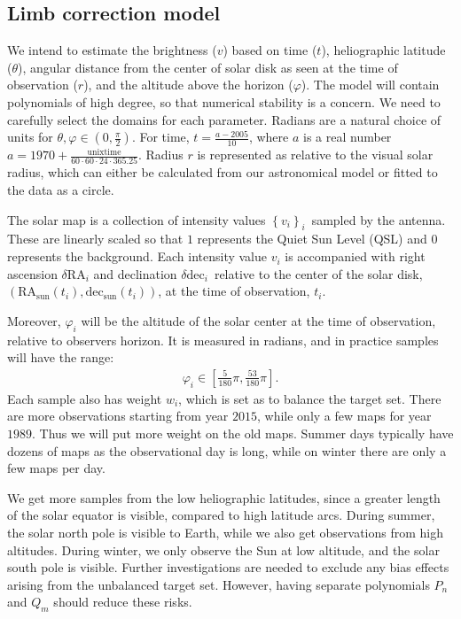 \documentclass{aa}
\newcommand{\eqnl}[2]{\begin{eqnarray}\label{#1}#2\end{eqnarray}}
\begin{document}
\subsection{Limb correction model}

We intend to estimate the brightness ($v$) based on time ($t$), heliographic latitude ($\theta$), angular distance from the 
center of solar disk as seen at the time of observation ($r$), and the altitude above the horizon ($\varphi$). The model 
will contain polynomials of high degree, so that numerical stability is a concern. We need to carefully select the 
domains for each parameter. Radians are a natural choice of units for $\theta, \varphi \in \left( 0, \frac{\pi}{2} 
\right)$. For time, $t = \frac{a - 2005}{10}$, where $a$ is a real number $a = 1970 + 
\frac{\mathrm{unixtime}}{60\cdot60\cdot24\cdot365.25}$. Radius $r$ is represented as relative to the visual solar radius, which can 
either be calculated from our astronomical model or fitted to the data as a circle.


The solar map is a collection of intensity values $\left\{ v_i \right\}_i$ sampled by the antenna. These are linearly scaled so that $1$ represents the Quiet Sun Level (QSL) and $0$ represents the background. Each intensity value 
$v_i$ is accompanied with right ascension $\delta \mathrm{RA}_i$ and declination $\delta 
\mathrm{dec}_i$ relative to the center of the solar disk, $\left( \mathrm{RA}_{\mathrm{sun}}(t_i), 
\mathrm{dec}_{\mathrm{sun}}(t_i) \right)$, at the time of observation, $t_i$.


Moreover, $\varphi_i$ will be the altitude of the solar center at the time of observation, relative 
to observers horizon. It is measured in radians, and in practice samples will have the range:
\eqnl{altitude_range}{
\varphi_i \in \left[ \frac{5}{180} \pi, \frac{53}{180} \pi \right] \text{.}
}
Each sample also has weight $w_i$, which is set as to balance the target set. 
There are more 
observations starting from year $2015$, while only a few maps for year $1989$. 
Thus we will put more weight on the old 
maps. Summer days typically have dozens of maps as the observational day is long, while on winter there are only a few maps per day.

We get more samples from the low heliographic latitudes, since a greater length of the solar equator is visible, 
compared to high latitude arcs. During summer, the solar north pole is visible to Earth, while we also get observations 
from high altitudes. During winter, we only observe the Sun at low altitude, and the solar south pole is visible. 
Further investigations are needed to exclude any bias effects arising from the unbalanced target set. However, having 
separate polynomials $P_n$ and $Q_m$ should reduce these risks. 
\end{document}
